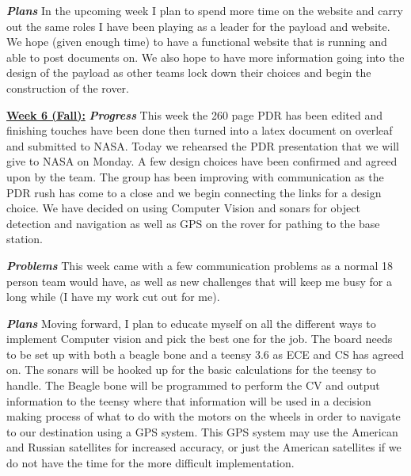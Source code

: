 \documentclass[onecolumn, draftclsnofoot, 10pt, compsoc]{IEEEtran}
\begin{document}
\textbf{\textit{{Plans}}}
\newline 
In the upcoming week I plan to spend more time on the website and carry out the same roles I have been playing as a leader for the payload and website. We hope (given enough time) to have a functional website that is running and able to post documents on. We also hope to have more information going into the design of the payload as other teams lock down their choices and begin the construction of the rover. 
\newline 

\underline{\textbf{Week 6 (Fall):}}
\newline\textbf{\textit{{Progress}}}
\newline 
This week the 260 page PDR has been edited and finishing touches have been done then turned into a latex document on overleaf and submitted to NASA. Today we rehearsed the PDR presentation that we will give to NASA on Monday. A few design choices have been confirmed and agreed upon by the team. The group has been improving with communication as the PDR rush has come to a close and we begin connecting the links for a design choice. We have decided on using Computer Vision and sonars for object detection and navigation as well as GPS on the rover for pathing to the base station. 
\newline 

\textbf{\textit{{Problems}}}
\newline 
This week came with a few communication problems as a normal 18 person team would have, as well as new challenges that will keep me busy for a long while (I have my work cut out for me). 
\newline 

\textbf{\textit{{Plans}}}
\newline 
Moving forward, I plan to educate myself on all the different ways to implement Computer vision and pick the best one for the job. The board needs to be set up with both a beagle bone and a teensy 3.6 as ECE and CS has agreed on. The sonars will be hooked up for the basic calculations for the teensy to handle. The Beagle bone will be programmed to perform the CV and output information to the teensy where that information will be used in a decision making process of what to do with the motors on the wheels in order to navigate to our destination using a GPS system. This GPS system may use the American and Russian satellites for increased accuracy, or just the American satellites if we do not have the time for the more difficult implementation. 
\newline 
\end{document}
